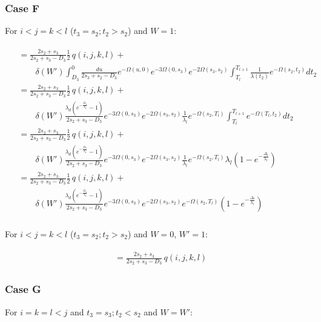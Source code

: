 \documentclass{article}
\begin{document}
\subsubsection{Case F}
For $i<j=k<l$ ($t_3=s_2; t_2>s_2$) and $W = 1$:

\begin{align}
    \begin{split}
        &= \frac{2s_2+s_3}{2s_2+s_3-D_3}\frac{1}{2}\,q(i,j,k,l) +\\
        &\qquad\delta(W')
        \int_{D_3}^{0}\frac{du}{2s_3+s_2-D_3}e^{-\Omega(u,0)}e^{-3\Omega(0,s_3)}e^{-2\Omega(s_3,s_2)}\int_{T_l}^{T_{l+1}}\frac{1}{\lambda(t_2)}e^{-\Omega(s_2,t_2)}dt_2\\
        &= \frac{2s_2+s_3}{2s_2+s_3-D_3}\frac{1}{2}\,q(i,j,k,l) +\\
        &\qquad\delta(W')
        \frac{\lambda_d\left(e^{-\frac{D_3}{\lambda_d}}-1\right)}{2s_2+s_3-D_3}e^{-3\Omega(0,s_3)}e^{-2\Omega(s_3,s_2)}\frac{1}{\lambda_l}e^{-\Omega(s_2,T_l)}\int_{T_l}^{T_{l+1}}e^{-\Omega(T_l,t_2)}dt_2\\
        &= \frac{2s_2+s_3}{2s_2+s_3-D_3}\frac{1}{2}\,q(i,j,k,l) +\\
        &\qquad\delta(W')
        \frac{\lambda_d\left(e^{-\frac{D_3}{\lambda_d}}-1\right)}{2s_2+s_3-D_3}e^{-3\Omega(0,s_3)}e^{-2\Omega(s_3,s_2)}\frac{1}{\lambda_l}e^{-\Omega(s_2,T_l)}\lambda_l\left(1-e^{-\frac{\Delta_l}{\lambda_l}}\right)\\
        &= \frac{2s_2+s_3}{2s_2+s_3-D_3}\frac{1}{2}\,q(i,j,k,l) +\\
        &\qquad\delta(W')
        \frac{\lambda_d\left(e^{-\frac{D_3}{\lambda_d}}-1\right)}{2s_2+s_3-D_3}e^{-3\Omega(0,s_3)}e^{-2\Omega(s_3,s_2)}e^{-\Omega(s_2,T_l)}\left(1-e^{-\frac{\Delta_l}{\lambda_l}}\right)\\
    \end{split}
\end{align}

For $i<j=k<l$ ($t_3=s_2; t_2>s_2$) and $W = 0$, $W' = 1$:

\begin{align}
    \begin{split}
        &= \frac{2s_2+s_3}{2s_2+s_3-D_3}\,q(i,j,k,l)
    \end{split}
\end{align}

\subsubsection{Case G}
For $i=k=l<j$ and $t_3=s_3; t_2<s_2$ and $W = W'$:
\end{document}
